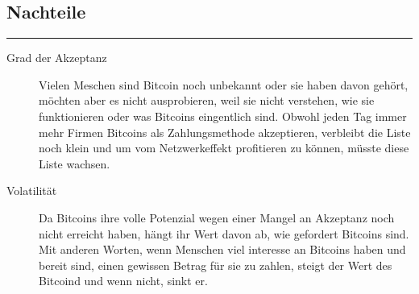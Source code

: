 \subsection*{Nachteile}
\vspace{-10mm}
\noindent\rule{0.8\textwidth}{0.4pt}
\begin{description}
  \item[Grad der Akzeptanz] Vielen Meschen sind Bitcoin noch unbekannt oder sie haben davon
  gehört, möchten aber es nicht ausprobieren, weil sie nicht verstehen, wie sie funktionieren
  oder was Bitcoins eingentlich sind. Obwohl jeden Tag immer mehr Firmen Bitcoins als Zahlungsmethode
  akzeptieren, verbleibt die Liste noch klein und um vom Netzwerkeffekt profitieren zu können, müsste
  diese Liste wachsen.
  \item[Volatilität] Da Bitcoins ihre volle Potenzial wegen einer Mangel an Akzeptanz noch nicht
  erreicht haben, hängt ihr Wert davon ab, wie gefordert Bitcoins sind. Mit anderen Worten, wenn Menschen
  viel interesse an Bitcoins haben und bereit sind, einen gewissen Betrag für sie zu zahlen, steigt der
  Wert des Bitcoind und wenn nicht, sinkt er.

\end{description}
